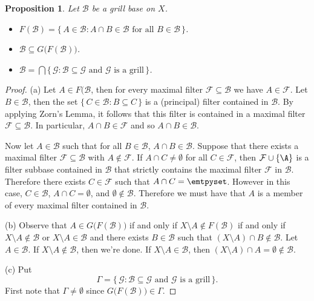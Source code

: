 \documentclass[12pt]{article}
\theoremstyle{plain}
\newtheorem{prop}[thm]{Proposition}
\theoremstyle{definition}
\newcommand{\calB}{\mathcal{B}}
\newcommand{\calF}{\mathcal{F}}
\newcommand{\calG}{\mathcal{G}}
\begin{document}
\begin{prop}
  Let $\calB$ be a grill base on $X$.
  \begin{itemize}
    \item[(a)] $F(\calB) = \{\, A \in \calB : \mbox{$A \cap B \in \calB$ for all $B \in \calB$} \,\}$.

    \item[(b)] $\calB \subseteq G\bigl(F(\calB)\bigr)$.

    \item[(c)] $\calB  = \bigcap\{\, \calG : \mbox{$\calB \subseteq \calG$ and $\calG$ is a grill} \,\}$.
  \end{itemize}
\end{prop}
\begin{proof}
  (a) 
  Let $A \in F(\calB$, then for every maximal filter $\calF \subseteq \calB$ we have $A \in \calF$. 
  Let $B \in \calB$, then the set $\{\, C \in \calB : B \subseteq C \,\}$ is a (principal) filter contained in $\calB$.
  By applying Zorn's Lemma, it follows that this filter is contained in a maximal filter $\calF \subseteq \calB$.
  In particular, $A \cap B \in \calF$ and so $A \cap B \in \calB$.

  Now let $A \in \calB$ such that for all $B \in \calB$, $A \cap B \in \calB$.
  Suppose that there exists a maximal filter $\calF \subseteq \calB$ with $A \not\in \calF$. 
  If $A \cap C \ne \emptyset$ for all $C \in \calF$, then $\calF \cup \{\A\}$ is a filter subbase contained in $\calB$ that strictly contains the maximal filter $\calF$ in $\calB$.
  Therefore there exists $C \in \calF$ such that $A \cap C = \emtpyset$.
  However in this case, $C \in \calB$, $A \cap C = \emptyset$, and $\emptyset \not\in \calB$.
  Therefore we must have that $A$ is a member of every maximal filter contained in $\calB$.

  (b)
  Observe that $A \in G\bigl(F(\calB)\bigr)$ if and only if $X \setminus A \not\in F(\calB)$ if and only if $X \setminus A \not\in \calB$ or $X \setminus A \in \calB$ and there exists $B \in \calB$ such that $(X \setminus A) \cap B \not\in \calB$.
  Let $A \in \calB$. 
  If $X \setminus A \not\in \calB$, then we're done.
  If $X \setminus A \in \calB$, then $(X \setminus A) \cap A = \emptyset \not\in \calB$.

  (c)
  Put
  \[
    \Gamma = \{\, \calG : \mbox{$\calB \subseteq \calG$ and $\calG$ is a grill} \,\}.
  \]
  First note that $\Gamma \ne \emptyset$ since $G\bigl(F(\calB)\bigr) \in \Gamma$.
  
\end{proof}




\theendnotes



\end{document}
